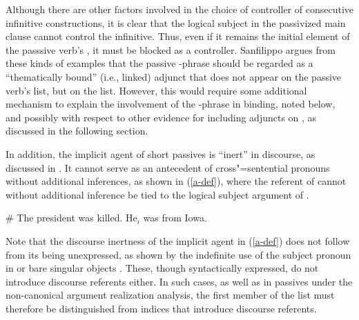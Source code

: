 \documentclass[output=paper
                ,modfonts
                ,nonflat
	        ,collection
	        ,collectionchapter
	        ,collectiontoclongg
 	        ,biblatex
                ,babelshorthands
                ,newtxmath
                ,draftmode
                ,colorlinks, citecolor=brown
]{./langsci/langscibook}
\begin{document}
Although there are other factors involved in the choice of controller of consecutive  infinitive constructions, it is clear that the logical subject in the passivized main clause cannot control the infinitive.
Thus, even if it remains the initial element of the passsive verb's \argst, it must be blocked as a controller.
Sanfilippo argues from these kinds of examples that the passive -phrase should be regarded as a ``thematically bound'' (i.e., linked) adjunct that does
not appear on the passive verb's \argst list, but on the  list.
However, this would require some additional mechanism to explain the involvement of the -phrase in binding, noted below, and possibly with respect to other evidence for including adjuncts on \argst, as discussed in the following section.

In addition, the implicit agent of short passives is ``inert'' in discourse, as discussed in \citet{KoenigandMauner1999}.
It cannot serve as an antecedent of cross"=sentential pronouns without additional inferences, as shown in (\ref{a-def}), where the referent of  cannot without additional inference be tied to the logical subject argument of .

\begin{exe}
\ex\label{a-def}
\# The president was killed. He$_{i}$ was from Iowa.
\end{exe}

Note that the discourse inertness of the implicit agent in (\ref{a-def}) does not follow from its being unexpressed, as shown by the indefinite use of the subject pronoun  in  \citep{Koenig1998c} or  bare singular objects \citep{FarkasandDeSwart2003}.
These, though syntactically expressed, do not introduce discourse referents either.
In such cases, as well as in passives under the non-canonical argument realization analysis, the first member of the \argst list must therefore be distinguished from indices that introduce discourse referents.
\end{document}
